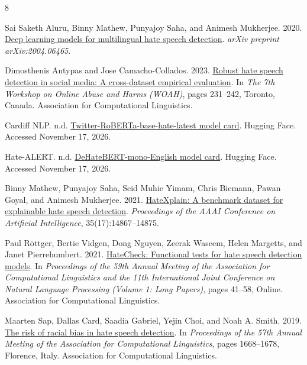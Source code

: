 \begin{thebibliography}{8}

Sai Saketh Aluru, Binny Mathew, Punyajoy Saha, and Animesh Mukherjee. 2020.
\newblock \href{https://arxiv.org/abs/2004.06465}{Deep learning models for multilingual hate speech detection}.
\newblock \textit{arXiv preprint arXiv:2004.06465}.

Dimosthenis Antypas and Jose Camacho-Collados. 2023.
\newblock \href{https://doi.org/10.18653/v1/2023.woah-1.25}{Robust hate speech detection in social media: A cross-dataset empirical evaluation}.
\newblock In \textit{The 7th Workshop on Online Abuse and Harms (WOAH)}, pages 231--242, Toronto, Canada. Association for Computational Linguistics.

Cardiff NLP. n.d.
\newblock \href{https://huggingface.co/cardiffnlp/twitter-roberta-base-hate-latest}{Twitter-RoBERTa-base-hate-latest model card}.
\newblock Hugging Face. Accessed November 17, 2026.

Hate-ALERT. n.d.
\newblock \href{https://huggingface.co/Hate-speech-CNERG/dehatebert-mono-english}{DeHateBERT-mono-English model card}.
\newblock Hugging Face. Accessed November 17, 2026.

Binny Mathew, Punyajoy Saha, Seid Muhie Yimam, Chris Biemann, Pawan Goyal, and Animesh Mukherjee. 2021.
\newblock \href{https://doi.org/10.1609/aaai.v35i17.17745}{HateXplain: A benchmark dataset for explainable hate speech detection}.
\newblock \textit{Proceedings of the AAAI Conference on Artificial Intelligence}, 35(17):14867--14875.

Paul R{\"o}ttger, Bertie Vidgen, Dong Nguyen, Zeerak Waseem, Helen Margetts, and Janet Pierrehumbert. 2021.
\newblock \href{https://doi.org/10.18653/v1/2021.acl-long.4}{HateCheck: Functional tests for hate speech detection models}.
\newblock In \textit{Proceedings of the 59th Annual Meeting of the Association for Computational Linguistics and the 11th International Joint Conference on Natural Language Processing (Volume 1: Long Papers)}, pages 41--58, Online. Association for Computational Linguistics.

Maarten Sap, Dallas Card, Saadia Gabriel, Yejin Choi, and Noah A. Smith. 2019.
\newblock \href{https://doi.org/10.18653/v1/P19-1163}{The risk of racial bias in hate speech detection}.
\newblock In \textit{Proceedings of the 57th Annual Meeting of the Association for Computational Linguistics}, pages 1668--1678, Florence, Italy. Association for Computational Linguistics.

\end{thebibliography}
